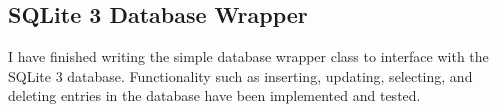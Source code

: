 \subsection{SQLite 3 Database Wrapper}
\label{task:20140322_jkn0}
I have finished writing the simple database wrapper class to interface with the SQLite 3 database. Functionality such as inserting, updating, selecting, and deleting entries in the database have been implemented and tested.
